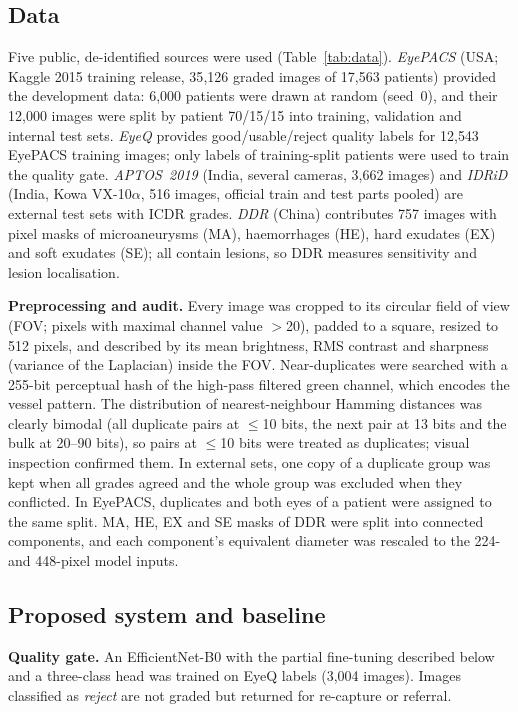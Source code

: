 \subsection{Data}
Five public, de-identified sources were used (Table~\ref{tab:data}). \emph{EyePACS} \cite{cuadros2009} (USA; Kaggle 2015 training release, 35{,}126 graded images of 17{,}563 patients) provided the development data: 6{,}000 patients were drawn at random (seed~0), and their 12{,}000 images were split by patient 70/15/15 into training, validation and internal test sets. \emph{EyeQ} \cite{fu2019} provides good/usable/reject quality labels for 12{,}543 EyePACS training images; only labels of training-split patients were used to train the quality gate. \emph{APTOS~2019} \cite{aptos2019} (India, several cameras, 3{,}662 images) and \emph{IDRiD} \cite{porwal2018} (India, Kowa VX-10$\alpha$, 516 images, official train and test parts pooled) are external test sets with ICDR grades. \emph{DDR} \cite{li2019} (China) contributes 757 images with pixel masks of microaneurysms (MA), haemorrhages (HE), hard exudates (EX) and soft exudates (SE); all contain lesions, so DDR measures sensitivity and lesion localisation.

\textbf{Preprocessing and audit.} Every image was cropped to its circular field of view (FOV; pixels with maximal channel value $>$20), padded to a square, resized to 512 pixels, and described by its mean brightness, RMS contrast and sharpness (variance of the Laplacian) inside the FOV. Near-duplicates were searched with a 255-bit perceptual hash of the high-pass filtered green channel, which encodes the vessel pattern. The distribution of nearest-neighbour Hamming distances was clearly bimodal (all duplicate pairs at $\leq$10 bits, the next pair at 13 bits and the bulk at 20--90 bits), so pairs at $\leq$10 bits were treated as duplicates; visual inspection confirmed them. In external sets, one copy of a duplicate group was kept when all grades agreed and the whole group was excluded when they conflicted. In EyePACS, duplicates and both eyes of a patient were assigned to the same split. MA, HE, EX and SE masks of DDR were split into connected components, and each component's equivalent diameter was rescaled to the 224- and 448-pixel model inputs.

\subsection{Proposed system and baseline}
\textbf{Quality gate.} An EfficientNet-B0 with the partial fine-tuning described below and a three-class head was trained on EyeQ labels (3{,}004 images). Images classified as \emph{reject} are not graded but returned for re-capture or referral.

